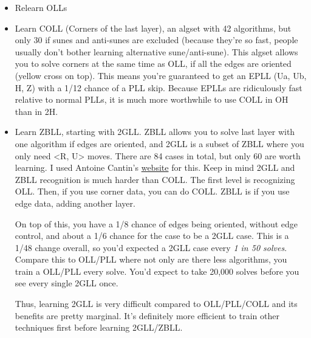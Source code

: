 \documentclass[11pt, oneside]{article}
\begin{document}
\begin{itemize}
\begin{itemize}
    \end{itemize}
  \item Relearn OLLs
  \item Learn COLL (Corners of the last layer), an algset with 42 algorithms,
    but only 30 if sunes and anti-sunes are excluded (because they're so fast,
    people usually don't bother learning alternative sune/anti-sune).
    This algset allows you to solve corners at the same time as OLL, if all
    the edges are oriented (yellow cross on top). This means you're guaranteed
    to get an EPLL (Ua, Ub, H, Z) with a 1/12 chance of a PLL skip.
    Because EPLLs are ridiculously fast relative to normal PLLs,
    it is much more worthwhile to use COLL in OH than in 2H.
  \item Learn ZBLL, starting with 2GLL. ZBLL allows you to solve last layer with
    one algorithm if edges are oriented, and 2GLL is a subset of ZBLL where you
    only need <R, U> moves. There are 84 cases in total, but only 60 are worth
    learning. I used Antoine Cantin's
    \href{https://sites.google.com/site/antoineccantin/2gll}{website} for this.
    Keep in mind 2GLL and ZBLL recognition is much harder than COLL.
    The first level is recognizing OLL. Then, if you use corner data,
    you can do COLL. ZBLL is if you use edge data, adding another layer.

    On top of this, you have a 1/8 chance of edges being oriented, without
    edge control, and about a 1/6 chance for the case to be a 2GLL case.
    This is a 1/48 change overall, so you'd expected a 2GLL case every
    \textit{1 in 50 solves}. Compare this to OLL/PLL where not only are there
    less algorithms, you train a OLL/PLL every solve.
    You'd expect to take 20,000 solves before you see every single 2GLL once.

    Thus, learning 2GLL is very difficult compared to OLL/PLL/COLL and its
    benefits are pretty marginal. It's definitely more efficient to train other
    techniques first before learning 2GLL/ZBLL.
\end{itemize}
\end{document}
